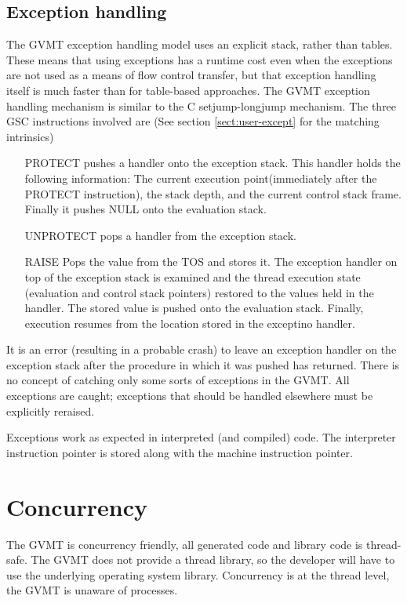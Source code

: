 \subsection{Exception handling}
The GVMT exception handling model uses an explicit stack, rather than tables. These means that using exceptions has a runtime cost even when the exceptions are not used as a means of flow control transfer, but that exception handling itself is much faster than for table-based approaches. The GVMT exception handling mechanism is similar to the C setjump-longjump mechanism.
The three GSC instructions involved are (See section \ref{sect:user-except} for the matching intrinsics)
\begin{itemize}
\item [PROTECT] pushes a handler onto the exception stack. This handler holds the following information: The current execution point(immediately after the PROTECT instruction), the stack depth, and the current control stack frame. Finally it pushes NULL onto the evaluation stack. 
\item [UNPROTECT] pops a handler from the exception stack.
\item [RAISE] Pops the value from the TOS and stores it. The exception handler on top of the exception stack is examined and the thread execution state (evaluation and control stack pointers) restored to the values held in the handler. The stored value is pushed onto the evaluation stack. Finally, execution resumes from the location stored in the exceptino handler.
\end{itemize}
It is an error (resulting in a probable crash) to leave an exception handler on the exception stack after the procedure in which it was pushed has returned.
There is no concept of catching only some sorts of exceptions in the GVMT. All exceptions are caught; exceptions that should be handled elsewhere must be explicitly reraised. 

Exceptions work as expected in interpreted (and compiled) code. The interpreter instruction pointer is stored along with the machine instruction pointer.

\section{Concurrency\label{sect:conc}}

The GVMT is concurrency friendly, all generated code and library code is thread-safe. The GVMT does not provide a thread library, so the developer will have to use the underlying operating system library.
Concurrency is at the thread level, the GVMT is unaware of processes.

